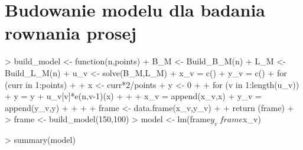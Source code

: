 \documentclass{article}
\begin{document}
\section{Budowanie modelu dla badania rownania prosej}


\begin{Schunk}
\begin{Sinput}
> build_model <- function(n,points){
+   B_M <- Build_B_M(n)
+   L_M <- Build_L_M(n)
+   u_v <- solve(B_M,L_M)
+   x_v = c()
+   y_v = c()
+   for (curr in 1:points){
+     
+     x <- curr*2/points
+     y <- 0
+     
+     for (v in 1:length(u_v)){
+       y = y + u_v[v]*e(n,v-1)(x)
+     }
+     
+     x_v = append(x_v,x)
+     y_v = append(y_v,y)
+   
+     
+   }
+   frame <- data.frame(x_v,y_v)
+  
+   return (frame)
+ }
> frame <- build_model(150,100)
> model <- lm(frame$y_v ~ frame$x_v)
\end{Sinput}
\end{Schunk}

\begin{Schunk}
\begin{Sinput}
> summary(model)
\end{Sinput}
\end{Schunk}
\end{document}
